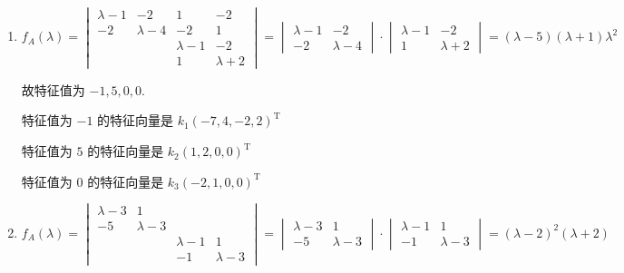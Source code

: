      \paragraph{} %
         \begin{enumerate}
             \item %
                   \( f_{A}(\lambda) = \begin{vmatrix}
                       \lambda - 1 & -2          & 1           & -2          \\
                       -2          & \lambda - 4 & -2          & 1           \\
                                   &             & \lambda - 1 & -2          \\
                                   &             & 1           & \lambda + 2
                   \end{vmatrix} = \begin{vmatrix}
                       \lambda - 1 & -2          \\
                       -2          & \lambda - 4
                   \end{vmatrix} \cdot \begin{vmatrix}
                       \lambda - 1 & -2          \\
                       1           & \lambda + 2
                   \end{vmatrix} = (\lambda - 5)(\lambda + 1)\lambda^{2} \)

                   故特征值为 \( -1, 5, 0, 0 \).

                   特征值为 \( -1 \) 的特征向量是 \( k_{1}(-7, 4, -2, 2)^{\mathrm{T}} \)

                   特征值为 \( 5 \) 的特征向量是 \( k_{2}(1, 2, 0, 0)^{\mathrm{T}} \)

                   特征值为 \( 0 \) 的特征向量是 \( k_{3}(-2, 1, 0, 0)^{\mathrm{T}} \)
             \item %
                   \( f_{A}(\lambda) = \begin{vmatrix}
                       \lambda - 3 & 1           &           &           \\
                       -5          & \lambda - 3 &           &           \\
                                   &             & \lambda-1 & 1         \\
                                   &             & -1        & \lambda-3
                   \end{vmatrix} = \begin{vmatrix}
                       \lambda - 3 & 1           \\
                       -5          & \lambda - 3
                   \end{vmatrix} \cdot \begin{vmatrix}
                       \lambda - 1 & 1           \\
                       -1          & \lambda - 3
                   \end{vmatrix} = (\lambda - 2)^{2}(\lambda + 2) \)


\end{enumerate}
